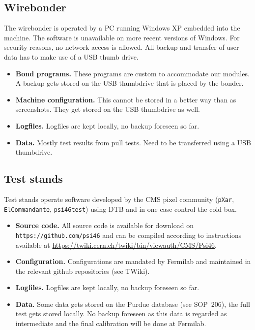 \documentclass[12pt]{unlsilabsop}
\begin{document}
\subsection{Wirebonder}
The wirebonder is operated by a PC running Windows XP embedded into the machine. The software is unavailable on more recent versions of Windows. For security reasons, no network access is allowed. All backup and transfer of user data has to make use of a USB thumb drive.
\begin{itemize}
    \item \textbf{Bond programs.} These programs are custom to accommodate our modules. A backup gets stored on the USB thumbdrive that is placed by the bonder.
    \item \textbf{Machine configuration.} This cannot be stored in a better way than as screenshots. They get stored on the USB thumbdrive as well.
    \item \textbf{Logfiles.} Logfiles are kept locally, no backup foreseen so far.
    \item \textbf{Data.} Mostly test results from pull tests. Need to be transferred using a USB thumbdrive.
\end{itemize}

\subsection{Test stands}
Test stands operate software developed by the CMS pixel community (\texttt{pXar}, \texttt{ElCommandante}, \texttt{psi46test}) using DTB and in one case control the cold box.
\begin{itemize}
    \item \textbf{Source code.} All source code is available for download on \texttt{https://github.com/psi46} and can be compiled according to instructions available at \url{https://twiki.cern.ch/twiki/bin/viewauth/CMS/Psi46}.
    \item \textbf{Configuration.} Configurations are mandated by Fermilab and maintained in the relevant github repositories (see TWiki).
    \item \textbf{Logfiles.} Logfiles are kept locally, no backup foreseen so far.
    \item \textbf{Data.} Some data gets stored on the Purdue database (see SOP~206), the full test gets stored locally. No backup foreseen as this data is regarded as intermediate and the final calibration will be done at Fermilab.
\end{itemize}
\end{document}
